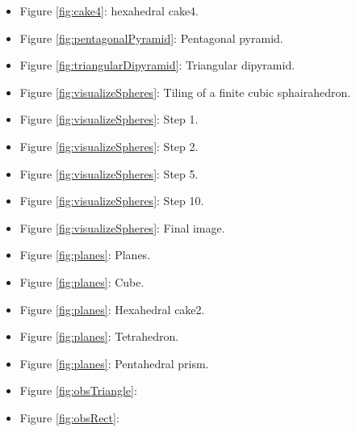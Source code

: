 \documentclass[suppldata, dvipdfmx]{interact}
\theoremstyle{plain}%
\theoremstyle{definition}
\theoremstyle{remark}
\theoremstyle{problemstyle}
\begin{document}
\begin{itemize}
\item Figure \ref{fig:cake4}: hexahedral cake4.
\item Figure \ref{fig:pentagonalPyramid}: Pentagonal pyramid.
\item Figure \ref{fig:triangularDipyramid}: Triangular dipyramid.

\item Figure \ref{fig:visualizeSpheres}: Tiling of a finite cubic sphairahedron.
\item Figure
      \ref{fig:visualizeSpheres}: Step
      1.
\item Figure
      \ref{fig:visualizeSpheres}: Step
      2.
\item Figure
      \ref{fig:visualizeSpheres}: Step
      5.
\item Figure
      \ref{fig:visualizeSpheres}: Step
      10.
\item Figure
      \ref{fig:visualizeSpheres}:
      Final image.
%

\item Figure \ref{fig:planes}: Planes.
\item Figure \ref{fig:planes}: Cube.
\item Figure \ref{fig:planes}: Hexahedral cake2.
\item Figure \ref{fig:planes}: Tetrahedron.
\item Figure \ref{fig:planes}: Pentahedral
      prism.

\item Figure \ref{fig:obsTriangle}:
\item Figure \ref{fig:obsRect}:


\end{itemize}
\end{document}
